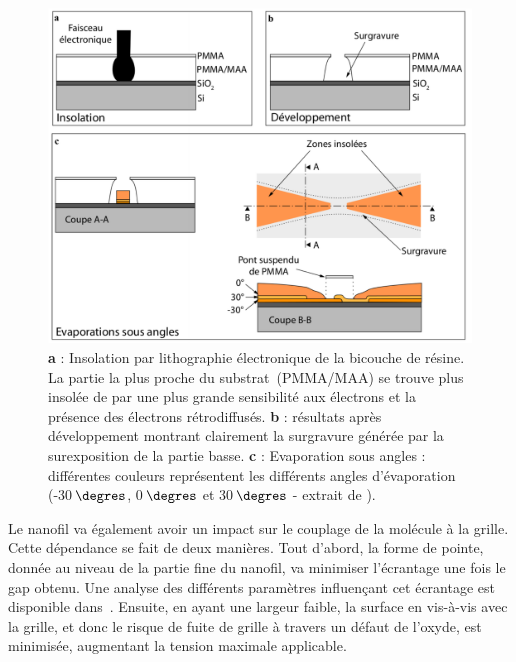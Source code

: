\begin{figure}[h!]
\centering \includegraphics[scale=0.45]{Fabrication/EvapAngle/EvapAngle.pdf}
\caption{\textbf{a} : Insolation par lithographie électronique de la bicouche de résine. La partie la plus proche du substrat~(PMMA/MAA) se trouve plus insolée de par une plus grande sensibilité aux électrons et la présence des électrons rétrodiffusés. \textbf{b} : résultats après développement montrant clairement la surgravure générée par la surexposition de la partie basse. \textbf{c} : Evaporation sous angles : différentes couleurs représentent les différents angles d'évaporation (-30$\,\degres$, 0$\,\degres$ et 30$\,\degres$ - extrait de \cite{RochPhD}).}
\label{EvapAngle}
\end{figure}

Le nanofil va également avoir un impact sur le couplage de la molécule à la grille. Cette dépendance se fait de deux manières. Tout d'abord, la forme de pointe, donnée au niveau de la partie fine du nanofil, va minimiser l'écrantage une fois le gap obtenu. Une analyse des différents paramètres influençant cet écrantage est disponible dans~\cite{Datta2009}. Ensuite, en ayant une largeur faible, la surface en vis-à-vis avec la grille, et donc le risque de fuite de grille à travers un défaut de l'oxyde, est minimisée, augmentant la tension maximale applicable.

